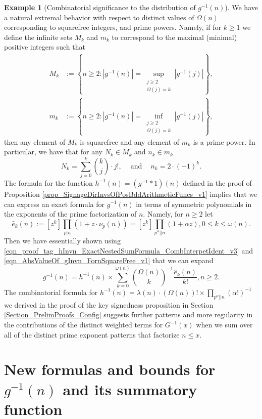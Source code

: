 \documentclass[11pt,reqno,a4letter]{article}
\numberwithin{figure}{section}
\numberwithin{table}{section}
\theoremstyle{plain}
\numberwithin{theorem}{section}
\theoremstyle{definition}
\newtheorem{example}[theorem]{Example}
\begin{document}
\begin{example}[Combinatorial significance to the distribution of $g^{-1}(n)$] 
We have a natural extremal behavior with respect to distinct values of $\Omega(n)$ 
corresponding to squarefree integers, and prime powers. Namely, if for $k \geq 1$ we define the 
infinite sets $M_k$ and $m_k$ to correspond to the maximal (minimal) positive integers such that 
\begin{align*} 
M_k & := \left\{n \geq 2: |g^{-1}(n)| = \underset{{\substack{j \geq 2 \\ \Omega(j) = k}}}{\operatorname{sup}} 
     |g^{-1}(j)|\right\}, \\  
m_k & := \left\{n \geq 2: |g^{-1}(n)| = \underset{{\substack{j \geq 2 \\ \Omega(j) = k}}}{\operatorname{inf}} 
     |g^{-1}(j)|\right\}, 
\end{align*} 
then any element of $M_k$ is squarefree and any element of $m_k$ is a prime power. 
In particular, we have that for any $N_k \in M_k$ and $n_k \in m_k$
\[
N_k = \sum_{j=0}^{k} \binom{k}{j} \cdot j!, \quad \mathrm{\ and\ } \quad n_k = 2 \cdot (-1)^{k}. 
\]
The formula for the function $h^{-1}(n) = (g^{-1} \ast 1)(n)$ defined in the proof of 
Proposition \ref{prop_SignageDirInvsOfPosBddArithmeticFuncs_v1} implies that we can express 
an exact formula for $g^{-1}(n)$ in terms of symmetric polynomials in the 
exponents of the prime factorization of $n$. 
Namely, for $n \geq 2$ let 
\[
\widehat{e}_k(n) := [z^k] \prod_{p|n} (1 + z \cdot \nu_p(n)) = [z^k] \prod_{p^{\alpha} || n} (1 + \alpha z), 
     0 \leq k \leq \omega(n). 
\]
Then we have essentially shown using 
\eqref{eqn_proof_tag_hInvn_ExactNestedSumFormula_CombInterpetIdent_v3} and 
\eqref{eqn_AbsValueOf_gInvn_FornSquareFree_v1} that we can expand 
\[
g^{-1}(n) = h^{-1}(n) \times \sum_{k=0}^{\omega(n)} \binom{\Omega(n)}{k}^{-1} 
     \frac{\widehat{e}_k(n)}{k!}, n \geq 2. 
\]
The combinatorial formula for 
$h^{-1}(n) = \lambda(n) \cdot (\Omega(n))! \times \prod_{p^{\alpha} || n} (\alpha !)^{-1}$ 
we derived in the proof of the key signedness proposition in 
Section \ref{Section_PrelimProofs_Config} 
suggests further patterns and more regularity in the contributions of the distinct weighted 
terms for $G^{-1}(x)$ when we sum over all of the distinct prime exponent patterns that factorize 
$n \leq x$. 
\end{example} 

\newpage
\section{New formulas and bounds for $g^{-1}(n)$ and its summatory function} 
\label{Section_NewFormulasForgInvn} 
\end{document}
